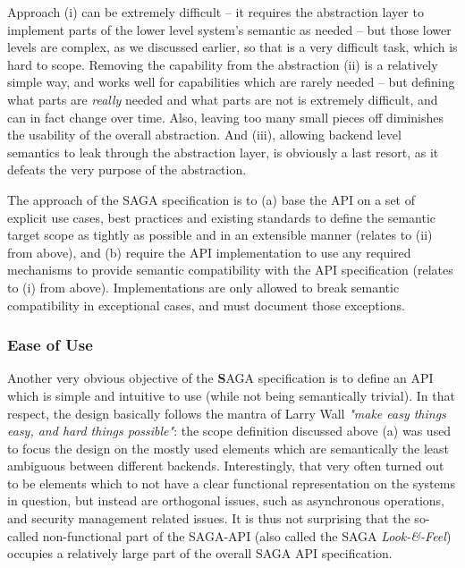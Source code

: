 \documentclass[a4paper,12pt]{article}
\newcommand{\I}[1]{\textit{#1}}
\newcommand{\B}[1]{\textbf{#1}}
\begin{document}
    Approach (i) can be extremely difficult -- it requires the
    abstraction layer to implement parts of the lower level system's
    semantic as needed -- but those lower levels are complex, as we
    discussed earlier, so that is a very difficult task, which is hard
    to scope.  Removing the capability from the abstraction (ii) is a
    relatively simple way, and works well for capabilities which are
    rarely needed -- but defining what parts are \I{really} needed and
    what parts are not is extremely difficult, and can in fact change
    over time.  Also, leaving too many small pieces off diminishes the
    usability of the overall abstraction.  And (iii), allowing backend
    level semantics to leak through the abstraction layer, is
    obviously a last resort, as it defeats the very purpose of the
    abstraction.

    The approach of the SAGA specification is to (a) base the API on a
    set of explicit use cases, best practices and existing standards
    to define the semantic target scope as tightly as possible and in
    an extensible manner (relates to (ii) from above), and (b) require
    the API implementation to use any required mechanisms to provide
    semantic compatibility with the API specification (relates to (i)
    from above).  Implementations are only allowed to break semantic
    compatibility in exceptional cases, and must document those
    exceptions.

   \subsubsection*{Ease of Use}


    Another very obvious objective of the \B{S}AGA specification is to
    define an API which is simple and intuitive to use (while not
    being semantically trivial).  In that respect, the design
    basically follows the mantra of Larry Wall \I{"make easy things
    easy, and hard things possible"}: the scope definition discussed
    above (a) was used to focus the design on the mostly used elements
    which are semantically the least ambiguous between different
    backends.  Interestingly, that very often turned out to be
    elements which to not have a clear functional representation on
    the systems in question, but instead are orthogonal issues, such
    as asynchronous operations, and security management related
    issues.  It is thus not surprising that the so-called
    non-functional part of the SAGA-API (also called the SAGA
    \I{Look-\&-Feel}) occupies a relatively large part of the overall
    SAGA API specification.
\end{document}
